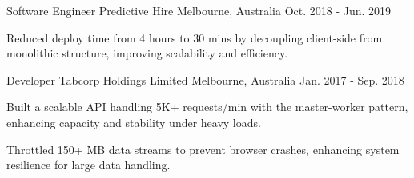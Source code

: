 \begin{cventries}
  \cventry
  {Software Engineer} %
  {Predictive Hire} %
  {Melbourne, Australia} %
  {Oct. 2018 - Jun. 2019} %
  {
    \begin{cvitems} %
      \item {Reduced deploy time from 4 hours to 30 mins by decoupling client-side from monolithic structure, improving scalability and efficiency.}
    \end{cvitems}
  }

  \cventry
  {Developer} %
  {Tabcorp Holdings Limited} %
  {Melbourne, Australia}
  {Jan. 2017 - Sep. 2018} %
  {
    \begin{cvitems} %
      \item {Built a scalable API handling 5K+ requests/min with the master-worker pattern, enhancing capacity and stability under heavy loads.}
      \item {Throttled 150+ MB data streams to prevent browser crashes, enhancing system resilience for large data handling.}
    \end{cvitems}
  }


\end{cventries}
